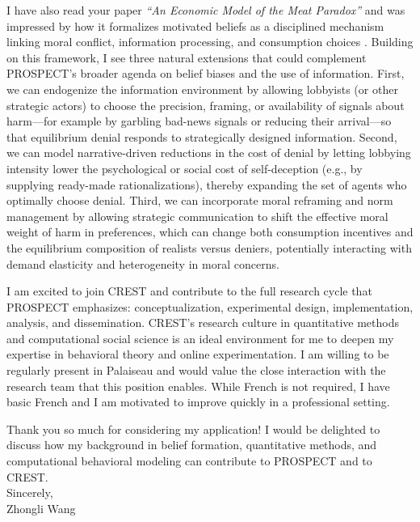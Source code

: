 \documentclass[11pt]{article}
\begin{document}
I have also read your paper \textit{``An Economic Model of the Meat Paradox''} and was impressed by how it formalizes motivated beliefs as a disciplined mechanism linking moral conflict, information processing, and consumption choices \citep{hestermann2020economic}. Building on this framework, I see three natural extensions that could complement PROSPECT's broader agenda on belief biases and the use of information. First, we can endogenize the information environment by allowing lobbyists (or other strategic actors) to choose the precision, framing, or availability of signals about harm---for example by garbling bad-news signals or reducing their arrival---so that equilibrium denial responds to strategically designed information. Second, we can model narrative-driven reductions in the cost of denial by letting lobbying intensity lower the psychological or social cost of self-deception (e.g., by supplying ready-made rationalizations), thereby expanding the set of agents who optimally choose denial. Third, we can incorporate moral reframing and norm management by allowing strategic communication to shift the effective moral weight of harm in preferences, which can change both consumption incentives and the equilibrium composition of realists versus deniers, potentially interacting with demand elasticity and heterogeneity in moral concerns.

I am excited to join CREST and contribute to the full research cycle that PROSPECT emphasizes: conceptualization, experimental design, implementation, analysis, and dissemination. CREST's research culture in quantitative methods and computational social science is an ideal environment for me to deepen my expertise in behavioral theory and online experimentation. I am willing to be regularly present in Palaiseau and would value the close interaction with the research team that this position enables. While French is not required, I have basic French and I am motivated to improve quickly in a professional setting.

Thank you so much for considering my application! I would be delighted to discuss how my background in belief formation, quantitative methods, and computational behavioral modeling can contribute to PROSPECT and to CREST.\\[3mm]

\noindent Sincerely,\\[12mm]
\noindent Zhongli Wang

\end{document}
